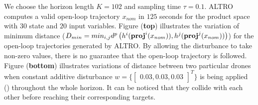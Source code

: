 We choose the horizon length $K=102$ and sampling time $\tau=0.1$. ALTRO computes a valid open-loop trajectory $x_{nom}$ in $125$ seconds for the product space with $30$ state and $20$ input variables. Figure  (\textbf{top}) illustrates the variation of minimum distance ($D_{min}=min_{i,j}d^{p}\left(h^i(\mathbf{proj}^i(x_{nom})),h^j(\mathbf{proj}^j(x_{nom}))\right)$) for the open-loop trajectories generated by ALTRO. By allowing the disturbance to take non-zero values, there is no guarantee that the open-loop trajectory is followed. Figure  (\textbf{bottom}) illustrates variations of distance between two particular drones when constant additive disturbance $w=\{\begin{bmatrix}0.03,0.03,0.03\end{bmatrix}^T\}$ is being applied () throughout the whole horizon. It can be noticed that they collide with each other before reaching their corresponding targets. %

 
